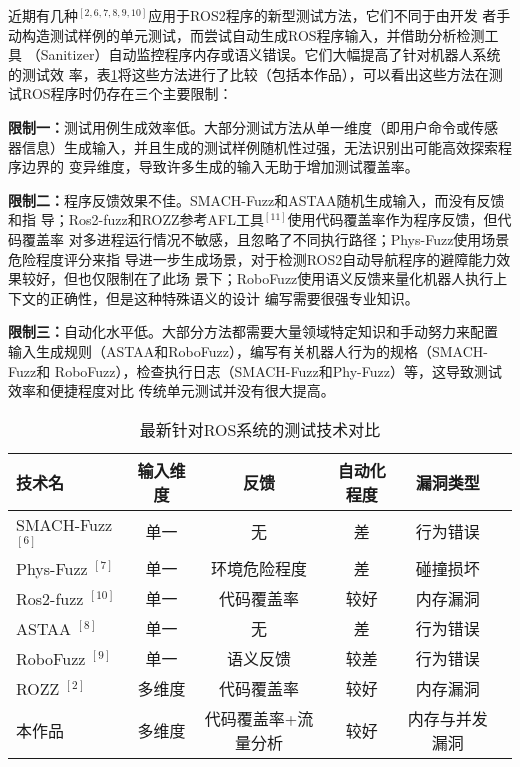 近期有几种$^{[2, 6, 7, 8, 9, 10]}$应用于ROS2程序的新型测试方法，它们不同于由开发
者手动构造测试样例的单元测试，而尝试自动生成ROS程序输入，并借助分析检测工具
（Sanitizer）自动监控程序内存或语义错误。它们大幅提高了针对机器人系统的测试效
率，表\ref{tab:fuzzers}将这些方法进行了比较（包括本作品），可以看出这些方法在测
试ROS程序时仍存在三个主要限制：

\textbf{限制一：}测试用例生成效率低。大部分测试方法从单一维度（即用户命令或传感
器信息）生成输入，并且生成的测试样例随机性过强，无法识别出可能高效探索程序边界的
变异维度，导致许多生成的输入无助于增加测试覆盖率。

\textbf{限制二：}程序反馈效果不佳。SMACH-Fuzz和ASTAA随机生成输入，而没有反馈和指
导；Ros2-fuzz和ROZZ参考AFL工具$^{[11]}$使用代码覆盖率作为程序反馈，但代码覆盖率
对多进程运行情况不敏感，且忽略了不同执行路径；Phys-Fuzz使用场景危险程度评分来指
导进一步生成场景，对于检测ROS2自动导航程序的避障能力效果较好，但也仅限制在了此场
景下；RoboFuzz使用语义反馈来量化机器人执行上下文的正确性，但是这种特殊语义的设计
编写需要很强专业知识。

\textbf{限制三：}自动化水平低。大部分方法都需要大量领域特定知识和手动努力来配置
输入生成规则（ASTAA和RoboFuzz），编写有关机器人行为的规格（SMACH-Fuzz和
RoboFuzz），检查执行日志（SMACH-Fuzz和Phy-Fuzz）等，这导致测试效率和便捷程度对比
传统单元测试并没有很大提高。

\begin{table}[H]
\small
\centering
\caption{最新针对ROS系统的测试技术对比}
\begin{tabular}{lccccc}
\hline
\textbf{技术名} & \textbf{输入维度}  & \textbf{反馈}& \textbf{自动化程度} & \textbf{漏洞类型} \\ \hline
SMACH-Fuzz $^{[6]}$ & 单一 & 无 & 差 & 行为错误 \\ 
Phys-Fuzz $^{[7]}$ & 单一  & 环境危险程度  & 差& 碰撞损坏 \\ 
Ros2-fuzz $^{[10]}$ & 单一  & 代码覆盖率   & 较好 & 内存漏洞 \\ 
ASTAA $^{[8]}$ & 单一 & 无 & 差 & 行为错误 \\ 
RoboFuzz $^{[9]}$ & 单一  & 语义反馈 & 较差 & 行为错误 \\ 
ROZZ $^{[2]}$ & 多维度 & 代码覆盖率 & 较好 & 内存漏洞 \\ 
本作品 & 多维度  & 代码覆盖率+流量分析 & 较好& 内存与并发漏洞 \\ \hline
\end{tabular}
\label{tab:fuzzers}
\end{table}

